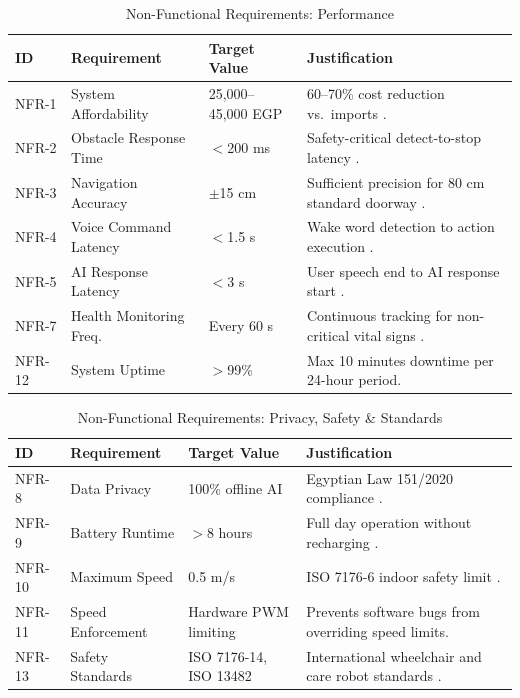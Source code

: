 \documentclass[12pt,a4paper]{report}
\renewcommand{\arraystretch}{1.45}
\renewcommand{\arraystretch}{1.3}
\begin{document}
\begin{table}[H]
\centering
\caption{Non-Functional Requirements: Performance}
\label{tab:nfr_perf}
{\renewcommand{\arraystretch}{1.6}
\begin{tabularx}{\textwidth}{@{}p{1.2cm}p{3.2cm}p{2cm}X@{}}
\toprule
\textbf{ID} & \textbf{Requirement} & \textbf{Target Value} & \textbf{Justification} \\
\midrule
\rowcolor{lightgray}
NFR-1  & System Affordability    & 25,000--45,000 EGP    & 60--70\% cost reduction vs.\ imports \cite{grandview_market}. \\
\midrule
NFR-2  & Obstacle Response Time  & $<$200 ms             & Safety-critical detect-to-stop latency \cite{iso13482}. \\
\midrule
NFR-3  & Navigation Accuracy     & $\pm$15 cm            & Sufficient precision for 80 cm standard doorway \cite{elalfy_monocular}. \\
\midrule
NFR-4  & Voice Command Latency   & $<$1.5 s              & Wake word detection to action execution . \\
\midrule
NFR-5  & AI Response Latency     & $<$3 s                & User speech end to AI response start \cite{llama}. \\
\midrule
NFR-7  & Health Monitoring Freq. & Every 60 s            & Continuous tracking for non-critical vital signs \cite{sonekar_2024}. \\
\midrule
NFR-12 & System Uptime           & $>$99\%               & Max 10 minutes downtime per 24-hour period. \\
\bottomrule
\end{tabularx}}
\end{table}

\begin{table}[H]
\centering
\caption{Non-Functional Requirements: Privacy, Safety \& Standards}
\label{tab:nfr_safety}
{\renewcommand{\arraystretch}{1.6}
\begin{tabularx}{\textwidth}{@{}p{1cm}p{3cm}p{2cm}X@{}}
\toprule
\textbf{ID} & \textbf{Requirement} & \textbf{Target Value} & \textbf{Justification} \\
\midrule
\rowcolor{lightgray}
NFR-8  & Data Privacy            & 100\% offline AI      & Egyptian Law 151/2020 compliance \cite{egypt_law_151}. \\
\midrule
NFR-9  & Battery Runtime         & $>$8 hours            & Full day operation without recharging \cite{iso7176_4}. \\
\midrule
NFR-10 & Maximum Speed           & 0.5 m/s               & ISO 7176-6 indoor safety limit \cite{iso7176_6}. \\
\midrule
NFR-11 & Speed Enforcement       & Hardware PWM limiting & Prevents software bugs from overriding speed limits. \\
\midrule
NFR-13 & Safety Standards        & ISO 7176-14, ISO 13482 & International wheelchair and care robot standards \cite{iso7176_14,iso13482}. \\
\bottomrule
\end{tabularx}}
\end{table}
\end{document}
